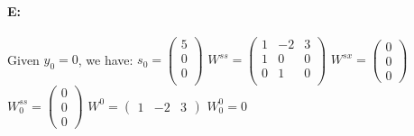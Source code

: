 \documentclass{article}
\begin{document}
\paragraph{E: } Given $y_0=0$, we have: \newline
$s_0=\begin{pmatrix}
    5 \\
    0 \\
    0 \\
\end{pmatrix}$ \newline
$W^{ss}=\begin{pmatrix}
    1&-2&3 \\
    1&0&0 \\
    0&1&0 \\
\end{pmatrix}$ \newline
$W^{sx}=\begin{pmatrix}
    0\\
    0\\
    0
\end{pmatrix}$ \newline
$W_0^{ss}=\begin{pmatrix}
    0\\
    0\\
    0
\end{pmatrix}$ \newline
$W^0=\begin{pmatrix}
    1&-2&3
\end{pmatrix}$ \newline
$W_0^0=0$
\end{document}
